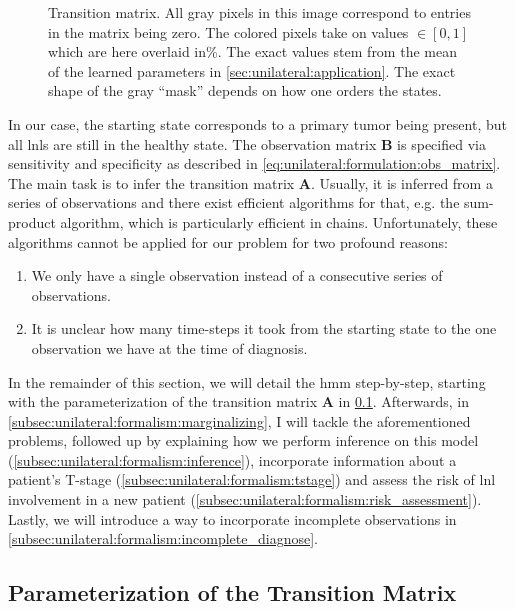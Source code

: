 \documentclass[\relativeRoot/main.tex]{subfiles}
\begin{document}
\begin{figure}
    \centering
    \def\svgwidth{0.8\textwidth}
    
    \caption[The HMM's transition matrix]{Transition matrix. All gray pixels in this image correspond to entries in the matrix being zero. The colored pixels take on values $\in [0, 1]$ which are here overlaid in\%. The exact values stem from the mean of the learned parameters in \cref{sec:unilateral:application}. The exact shape of the gray ``mask'' depends on how one orders the states.}
    \label{fig:unilateral:trans_matrix}
\end{figure}

In our case, the starting state corresponds to a primary tumor being present, but all \glspl{lnl} are still in the healthy state. The observation matrix $\mathbf{B}$ is specified via sensitivity and specificity as described in \cref{eq:unilateral:formulation:obs_matrix}. The main task is to infer the transition matrix $\mathbf{A}$. Usually, it is inferred from a series of observations and there exist efficient algorithms for that, e.g. the sum-product algorithm, which is particularly efficient in chains. Unfortunately, these algorithms cannot be applied for our problem for two profound reasons:

\begin{enumerate}
    \item We only have a single observation instead of a consecutive series of observations. 
    \item It is unclear how many time-steps it took from the starting state to the one observation we have at the time of diagnosis.
\end{enumerate}

In the remainder of this section, we will detail the \gls{hmm} step-by-step, starting with the parameterization of the transition matrix $\mathbf{A}$ in \cref{subsec:unilateral:formalism:parametrization}. Afterwards, in \cref{subsec:unilateral:formalism:marginalizing}, I will tackle the aforementioned problems, followed up by explaining how we perform inference on this model (\cref{subsec:unilateral:formalism:inference}), incorporate information about a patient's T-stage (\cref{subsec:unilateral:formalism:tstage}) and assess the risk of \gls{lnl} involvement in a new patient (\cref{subsec:unilateral:formalism:risk_assessment}). Lastly, we will introduce a way to incorporate incomplete observations in \cref{subsec:unilateral:formalism:incomplete_diagnose}.

\subsection{Parameterization of the Transition Matrix}
\label{subsec:unilateral:formalism:parametrization}
\end{document}
